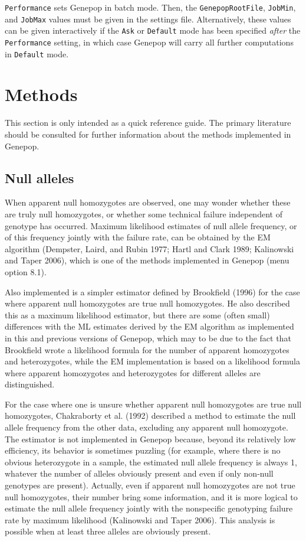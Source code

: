\documentclass[12pt,]{book}
\begin{document}
\texttt{Performance} sets Genepop in batch mode. Then,
the \texttt{GenepopRootFile}, \texttt{JobMin}, and \texttt{JobMax}
values must be given in the settings file. Alternatively, these values
can be given interactively if the \texttt{Ask} or \texttt{Default} mode
 has been specified \emph{after} the \texttt{Performance}
setting, in which case Genepop will carry all further computations in
\texttt{Default} mode.

\chapter{Methods}\label{methods}

This section is only intended as a quick reference guide. The primary
literature should be consulted for further information about the methods
implemented in Genepop.

\section{Null alleles}\label{null-alleles}

 When apparent null homozygotes are observed, one
may wonder whether these are truly null homozygotes, or whether some
technical failure independent of genotype has occurred. Maximum
likelihood estimates of null allele frequency, or of this frequency
jointly with the failure rate, can be obtained by the EM algorithm
(Dempster, Laird, and Rubin 1977; Hartl and Clark 1989; Kalinowski and
Taper 2006), which is one of the methods implemented in Genepop (menu
option 8.1).

Also implemented is a simpler estimator defined by Brookfield (1996) for
the case where apparent null homozygotes are true null homozygotes. He
also described this as a maximum likelihood estimator, but there are
some (often small) differences with the ML estimates derived by the EM
algorithm as implemented in this and previous versions of Genepop, which
may to be due to the fact that Brookfield wrote a likelihood formula for
the number of apparent homozygotes and heterozygotes, while the EM
implementation is based on a likelihood formula where apparent
homozygotes and heterozygotes for different alleles are distinguished.

For the case where one is unsure whether apparent null homozygotes are
true null homozygotes, Chakraborty et al. (1992) described a method to
estimate the null allele frequency from the other data, excluding any
apparent null homozygote. The estimator is not implemented in Genepop
because, beyond its relatively low efficiency, its behavior is sometimes
puzzling (for example, where there is no obvious heterozygote in a
sample, the estimated null allele frequency is always 1, whatever the
number of alleles obviously present and even if only non-null genotypes
are present). Actually, even if apparent null homozygotes are not true
null homozygotes, their number bring some information, and it is more
logical to estimate the null allele frequency jointly with the
nonspecific genotyping failure rate by maximum likelihood (Kalinowski
and Taper 2006). This analysis is possible when at least three alleles
are obviously present.
\end{document}
